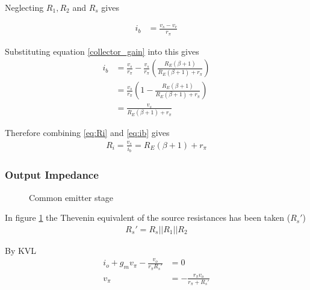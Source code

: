 \documentclass[a4paper,11pt]{article}
\begin{document}
Neglecting $R_1, R_2$ and $R_s$ gives

\begin{align*}
i_b &= \frac{v_s-v_e}{r_\pi} 
\end{align*}

Substituting equation \ref{collector_gain} into this gives
\begin{align}
i_b &= \frac{v_s}{r_\pi} - \frac{v_s}{r_\pi} (\frac{R_E (\beta + 1)}{R_E (\beta + 1) + r_\pi}) \nonumber \\
&= \frac{v_s}{r_\pi} (1- \frac{R_E (\beta + 1)}{R_E (\beta + 1) + r_\pi}) \nonumber \\
&= \frac{v_s}{R_E (\beta + 1) + r_\pi} \label{eq:ib}
\end{align}

Therefore combining \ref{eq:Ri} and \ref{eq:ib} gives 
\begin{align}
R_i = \frac{v_s}{i_b} = R_E (\beta + 1) + r_\pi \label{eq:collector_input_imp}
\end{align}

\subsubsection{Output Impedance}
\begin{figure}[H]
	\centering
	\caption{Common emitter stage}
	\label{fig:o_imp_collector}
	\hfill
\end{figure}

In figure \ref{fig:o_imp_collector} the Thevenin equivalent of the source resistances has been taken ($R_s'$)
\begin{align*}
R_s' = R_s || R_1 || R_2
\end{align*}

By KVL 
\begin{align}
i_o + g_m v_\pi - \frac{v_o}{r_\pi R_s'} &= 0 \label{eq:KVL}\\
v_\pi &= - \frac{r_\pi v_o}{r_\pi + R_s'} \label{eq:vpi}
\end{align}
\end{document}
